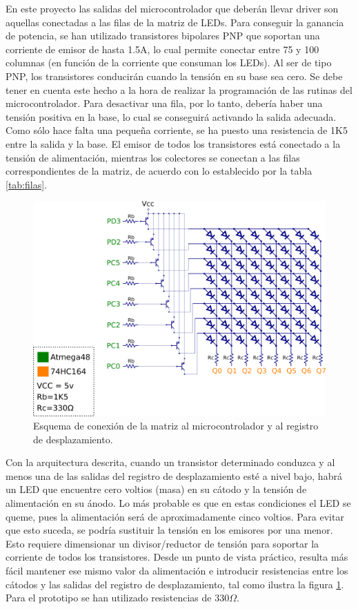 En este proyecto las salidas del microcontrolador que deberán llevar driver son aquellas conectadas a las filas de la matriz de LEDs. Para conseguir la ganancia de potencia, se han utilizado transistores bipolares PNP\cite{140} que soportan una corriente de emisor de hasta 1.5A, lo cual permite conectar entre 75 y 100 columnas (en función de la corriente que consuman los LEDs). Al ser de tipo PNP, los transistores conducirán cuando la tensión en su base sea cero. Se debe tener en cuenta este hecho a la hora de realizar la programación de las rutinas del microcontrolador. Para desactivar una fila, por lo tanto, debería haber una tensión positiva en la base, lo cual se conseguirá activando la salida adecuada. Como sólo hace falta una pequeña corriente, se ha puesto una resistencia de 1K5 entre la salida y la base. El emisor de todos los transistores está conectado a la tensión de alimentación, mientras los colectores se conectan a las filas correspondientes de la matriz, de acuerdo con lo establecido por la tabla \ref{tab:filas}.

\begin{figure}[!htp]
\centering
\includegraphics[width=350pt]{./images/esq_pnp.png}
\caption[Esquema de conexión matriz, microcontrolador y registro]{Esquema de conexión de la matriz al microcontrolador y al registro de desplazamiento.}
\label{fig:esq_pnp}
\end{figure}

Con la arquitectura descrita, cuando un transistor determinado conduzca y al menos una de las salidas del registro de desplazamiento esté a nivel bajo, habrá un LED que encuentre cero voltios (masa) en su cátodo y la tensión de alimentación en su ánodo. Lo más probable es que en estas condiciones el LED se queme, pues la alimentación será de aproximadamente cinco voltios. Para evitar que esto suceda, se podría sustituir la tensión en los emisores por una menor. Esto requiere dimensionar un divisor/reductor de tensión para soportar la corriente de todos los transistores. Desde un punto de vista práctico, resulta más fácil mantener ese mismo valor da alimentación e introducir resistencias entre los cátodos y las salidas del registro de desplazamiento, tal como ilustra la figura \ref{fig:esq_pnp}. Para el prototipo se han utilizado resistencias de 330$\Omega$.
